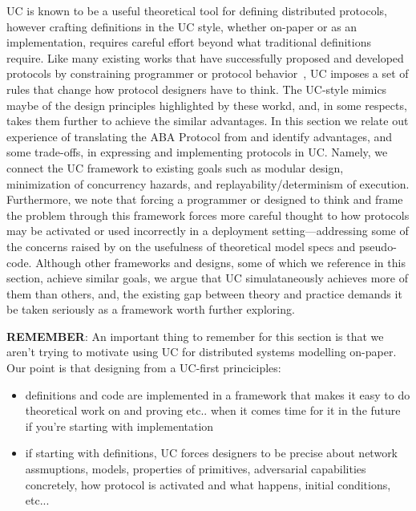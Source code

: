 UC is known to be a useful theoretical tool for defining distributed protocols, however crafting definitions in the UC style, whether on-paper or as an implementation, requires careful effort beyond what traditional definitions require.
Like many existing works that have successfully proposed and developed protocols by constraining programmer or protocol behavior~\cite{mace,macemc,farsite,farsiteretro,dbug}, UC imposes a set of rules that change how protocol designers have to think. 
The UC-style mimics maybe of the design principles highlighted by these workd, and, in some respects, takes them further to achieve the similar advantages. 
In this section we relate out experience of translating the ABA Protocol from \cite{ABA} and identify advantages, and some trade-offs, in expressing and implementing protocols in UC.
Namely, we connect the UC framework to existing goals such as modular design, minimization of concurrency hazards, and replayability/determinism of execution.
Furthermore, we note that forcing a programmer or designed to think and frame the problem through this framework forces more careful thought to how protocols may be activated or used incorrectly in a deployment setting---addressing some of the concerns raised by \cite{paxosthoughts} on the usefulness of theoretical model specs and pseudo-code.
Although other frameworks and designs, some of which we reference in this section, achieve similar goals, we argue that UC simulataneously achieves more of them than others, and, the existing gap between theory and practice demands it be taken seriously as a framework worth further exploring.

\textbf{REMEMBER}: An important thing to remember for this section is that we aren't trying to motivate using UC for distributed systems modelling on-paper.
Our point is that designing from a UC-first princiciples:
\begin{itemize} 
\item definitions and code are implemented in a framework that makes it easy to do theoretical work on and proving etc.. when it comes time for it in the future if you're starting with implementation
\item if starting with definitions, UC forces designers to be precise about network assmuptions, models, properties of primitives, adversarial capabilities concretely, how protocol is activated and what happens, initial conditions, etc...
\end{itemize}

